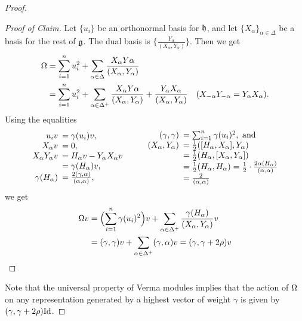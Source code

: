 \begin{proof}
\begin{proof}[Proof of Claim]
  Let $\{u_i\}$ be an orthonormal basis for $\mathfrak{h}$, and let $\{X_\alpha\}_{\alpha\in
  \Delta}$ be a basis for the rest of $\mathfrak{g}$. The dual basis is
  $\Big\{\frac{Y_\alpha}{(X_\alpha,Y_\alpha)}\Big\}$. Then we get
  \begin{align*}
    \Omega &= \sum_{i=1}^n u_i^2 + \sum_{\alpha\in \Delta}\frac{X_\alpha
    Y\alpha}{(X_\alpha,Y_\alpha)}\\
    &= \sum_{i=1}^n u_i^2 + \sum_{\alpha\in \Delta^+}\frac{X_\alpha
    Y\alpha}{(X_\alpha,Y_\alpha)}+\frac{Y_\alpha X_\alpha}{(X_\alpha,Y_\alpha)}
    & (X_{-\alpha} Y_{-\alpha} = Y_\alpha X_\alpha) .
  \end{align*}
  Using the equalities
  \begin{gather*}
   \begin{array}{rl}
     u_i v &\!\!\!= \gamma(u_i) v,\\
     X_\alpha v&\!\!\!=0,\\
     X_\alpha Y_\alpha v &\!\!\!= H_\alpha v - Y_\alpha X_\alpha v \\
       &\!\!\!= \gamma(H_\alpha) v,\\
     \gamma(H_\alpha) &\!\!\!= \frac{2(\gamma,\alpha)}{(\alpha,\alpha)},
   \end{array}\qquad
   \begin{array}{rl}
     (\gamma,\gamma) &\!\!\!= \sum_{i=1}^n \gamma(u_i)^2,\text{ and}\\
     (X_\alpha,Y_\alpha)&\!\!\!= \half ([H_\alpha,X_\alpha],Y_\alpha) \\
     &\!\!\!= \half(H_\alpha,[X_\alpha,Y_\alpha])\\
     &\!\!\!= \half (H_\alpha, H_\alpha) = \half \cdot \frac{2\alpha(H_\alpha)}{(\alpha,\alpha)}\\
     &\!\!\!= \frac{2}{(\alpha,\alpha)}
   \end{array}
  \end{gather*}
  we get
  \begin{align*}
    \Omega v &= \Bigl(\sum_{i=1}^n \gamma(u_i)^2\Bigr) v + \sum_{\alpha\in \Delta^+}
    \frac{\gamma(H_\alpha)}{(X_\alpha,Y_\alpha)} v\\
    &= (\gamma,\gamma) v + \sum_{\alpha\in \Delta^+}(\gamma,\alpha)v
    = (\gamma,\gamma+2\rho) v \qedhere
  \end{align*}
  \end{proof}

  Note that the universal property of Verma modules implies that the action of $\Omega$ on
  any representation generated by a highest vector of weight $\gamma$ is given by
  $(\gamma,\gamma+2\rho)\mathrm{Id}$.
  \smallskip


\end{proof}
